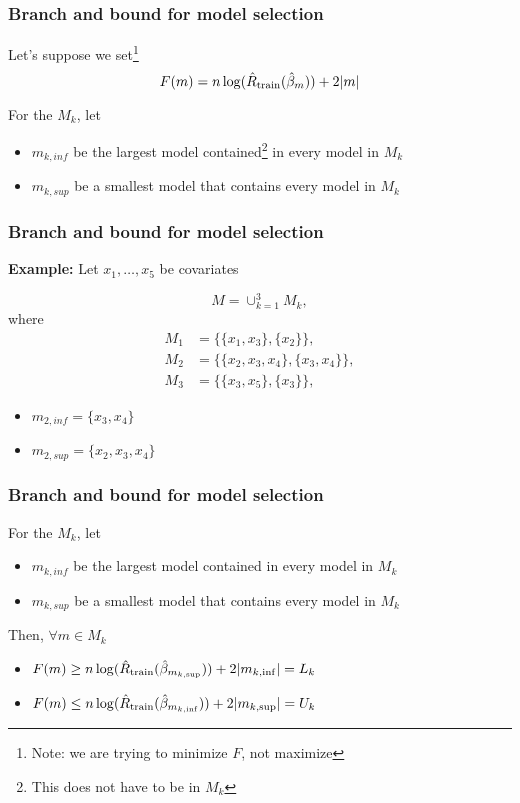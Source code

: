 \documentclass{beamer}
\begin{document}
\begin{frame}[fragile]
\frametitle{Branch and bound for model selection}
Let's suppose we set\footnote{Note: we are trying to minimize $F$, not maximize}
\[
F(m) = n \log(\hat{R}_{\textrm{train}}(\hat\beta_m)) + 2|m| 
\]

For the $M_k$, let
\begin{itemize}
\item[] $m_{k,inf}$ be the largest model contained\footnote{This does not have to be in $M_k$}
 in every model in $M_k$
\item[] $m_{k,sup}$ be a smallest model that contains every model in $M_k$
\end{itemize}

\end{frame}

\begin{frame}[fragile]
\frametitle{Branch and bound for model selection}
\textbf{Example:} Let $x_1, \ldots, x_5$ be covariates

\[
M  = \cup_{k=1}^3 M_k,
\]
where
\begin{align*}
M_1 
& = \{\{x_1,x_3\}, \{x_2\} \}, \\
M_2 
& = \{\{x_2,x_3,x_4\}, \{x_3,x_4\} \}, \\
 M_3 
& = \{\{x_3,x_5\}, \{x_3\} \}, 
\end{align*}
\pause

\begin{itemize}
\item[] $m_{2,inf} = \{x_3,x_4\}$
\item[] $m_{2,sup} = \{x_2,x_3,x_4\}$
\end{itemize}


\end{frame}

\begin{frame}[fragile]
\frametitle{Branch and bound for model selection}

For the $M_k$, let
\begin{itemize}
\item[] $m_{k,inf}$ be the largest model contained
 in every model in $M_k$
\item[] $m_{k,sup}$ be a smallest model that contains every model in $M_k$
\end{itemize}
\vsp

Then, $\forall m \in M_k$
\begin{itemize}
\item[] $F(m) \geq n \log(\hat{R}_{\textrm{train}}(\hat\beta_{m_{k,\sup}})) + 2|m_{k,\inf}| = L_k$  
\item[] $F(m) \leq n \log(\hat{R}_{\textrm{train}}(\hat\beta_{m_{k,\inf}})) + 2|m_{k,\sup}|  = U_k$ 
\end{itemize}

\end{frame}
\end{document}
